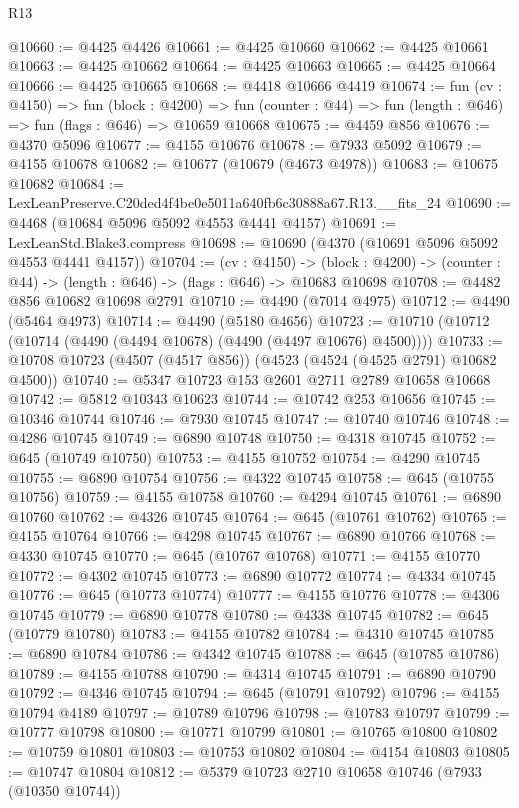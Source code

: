 \begin{lexlean}{R13}
\begin{coremodule}
@10660 := @4425 @4426
@10661 := @4425 @10660
@10662 := @4425 @10661
@10663 := @4425 @10662
@10664 := @4425 @10663
@10665 := @4425 @10664
@10666 := @4425 @10665
@10668 := @4418 @10666 @4419
@10674 := fun (cv : @4150) =>
  fun (block : @4200) =>
  fun (counter : @44) => fun (length : @646) => fun (flags : @646) => @10659 @10668
@10675 := @4459 @856
@10676 := @4370 @5096
@10677 := @4155 @10676
@10678 := @7933 @5092
@10679 := @4155 @10678
@10682 := @10677 (@10679 (@4673 @4978))
@10683 := @10675 @10682
@10684 := LexLeanPreserve.C20ded4f4be0e5011a640fb6c30888a67.R13.__fits_24
@10690 := @4468 (@10684 @5096 @5092 @4553 @4441 @4157)
@10691 := LexLeanStd.Blake3.compress
@10698 := @10690 (@4370 (@10691 @5096 @5092 @4553 @4441 @4157))
@10704 := (cv : @4150) ->
  (block : @4200) -> (counter : @44) -> (length : @646) -> (flags : @646) -> @10683 @10698
@10708 := @4482 @856 @10682 @10698 @2791
@10710 := @4490 (@7014 @4975)
@10712 := @4490 (@5464 @4973)
@10714 := @4490 (@5180 @4656)
@10723 := @10710 (@10712 (@10714 (@4490 (@4494 @10678) (@4490 (@4497 @10676) @4500))))
@10733 := @10708 @10723 (@4507 (@4517 @856)) (@4523 (@4524 (@4525 @2791) @10682 @4500))
@10740 := @5347 @10723 @153 @2601 @2711 @2789 @10658 @10668
@10742 := @5812 @10343 @10623
@10744 := @10742 @253 @10656
@10745 := @10346 @10744
@10746 := @7930 @10745
@10747 := @10740 @10746
@10748 := @4286 @10745
@10749 := @6890 @10748
@10750 := @4318 @10745
@10752 := @645 (@10749 @10750)
@10753 := @4155 @10752
@10754 := @4290 @10745
@10755 := @6890 @10754
@10756 := @4322 @10745
@10758 := @645 (@10755 @10756)
@10759 := @4155 @10758
@10760 := @4294 @10745
@10761 := @6890 @10760
@10762 := @4326 @10745
@10764 := @645 (@10761 @10762)
@10765 := @4155 @10764
@10766 := @4298 @10745
@10767 := @6890 @10766
@10768 := @4330 @10745
@10770 := @645 (@10767 @10768)
@10771 := @4155 @10770
@10772 := @4302 @10745
@10773 := @6890 @10772
@10774 := @4334 @10745
@10776 := @645 (@10773 @10774)
@10777 := @4155 @10776
@10778 := @4306 @10745
@10779 := @6890 @10778
@10780 := @4338 @10745
@10782 := @645 (@10779 @10780)
@10783 := @4155 @10782
@10784 := @4310 @10745
@10785 := @6890 @10784
@10786 := @4342 @10745
@10788 := @645 (@10785 @10786)
@10789 := @4155 @10788
@10790 := @4314 @10745
@10791 := @6890 @10790
@10792 := @4346 @10745
@10794 := @645 (@10791 @10792)
@10796 := @4155 @10794 @4189
@10797 := @10789 @10796
@10798 := @10783 @10797
@10799 := @10777 @10798
@10800 := @10771 @10799
@10801 := @10765 @10800
@10802 := @10759 @10801
@10803 := @10753 @10802
@10804 := @4154 @10803
@10805 := @10747 @10804
@10812 := @5379 @10723 @2710 @10658 @10746 (@7933 (@10350 @10744))

\end{coremodule}
\end{lexlean}
